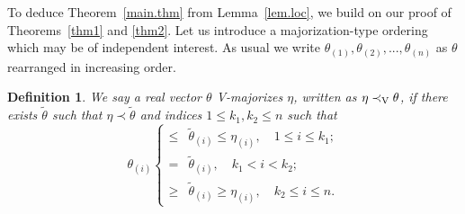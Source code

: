 \documentclass[11pt]{article}
\newtheorem{definition}{\bf Definition}
\begin{document}
To deduce Theorem~\ref{main.thm} from Lemma~\ref{lem.loc}, we build on our proof of Theorems~\ref{thm1} and \ref{thm2}.  Let us introduce a majorization-type ordering which may be of independent interest.  As usual we write $\theta_{(1)},\theta_{(2)},..., \theta_{(n)}$ as $\theta$ rearranged in increasing order. 
\begin{definition} 
We say a real vector $\theta$ {\it V-majorizes} $\eta$, written as $\eta\prec_{\rm V} \theta$, if there exists $\tilde{\theta}$ such that $\eta\prec \tilde{\theta}$ and  indices $1\leq k_1, k_2\leq n$ such that 
\begin{equation}
\label{major.V}
\theta_{(i)}\begin{cases} \leq  &\tilde{\theta}_{(i)}\leq \eta_{(i)},\quad 1\leq i\leq k_1;\\
 = & \tilde{\theta}_{(i)},\quad k_1<i<k_2;\\
\geq & \tilde{\theta}_{(i)}\geq \eta_{(i)},\quad k_2\leq i \leq n.
\end{cases}
\end{equation}
\end{definition}
\end{document}
